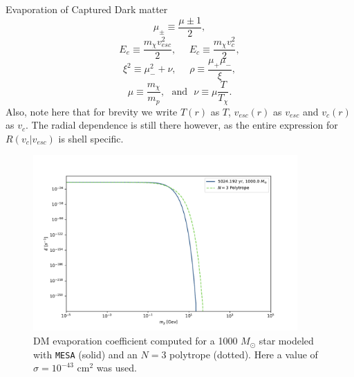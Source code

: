 \documentclass[a4paper,11pt]{article}
\begin{document}
\begin{section}{Evaporation of Captured Dark matter}
\begin{equation*}
    \end{equation*}
    \begin{equation*}
        \mu_{\pm} \equiv \frac{\mu \pm 1}{2} , 
    \end{equation*}
    \begin{equation*}
        E_e \equiv \frac{m_\chi v_{esc}^2}{2}, ~~~~~~ E_c \equiv \frac{m_\chi v_c^2}{2} ,
    \end{equation*}
    \begin{equation*}
        \xi^2 \equiv \mu_-^2 + \nu, ~~~~~~ \rho \equiv \frac{\mu_+\mu_-}{\xi} ,
    \end{equation*}
    \begin{equation*}
        \mu \equiv \frac{m_\chi}{m_p}, ~~~\text{and}~~~ \nu \equiv \mu \frac{T}{T_\chi} .
    \end{equation*}
    Also, note here that for brevity we write $T(r)$ as $T$, $v_{esc}(r)$ as $v_{esc}$ and $v_{c}(r)$ as $v_c$. The radial dependence is still there however, as the entire expression for $R(v_c | v_{esc})$ is shell specific.

    \begin{figure}
        \centering
        \includegraphics[width=0.9\textwidth]{Evap.pdf}
        \caption{DM evaporation coefficient computed for a 1000 $M_\odot$ star modeled with \texttt{MESA} (solid) and an $N=3$ polytrope (dotted). Here a value of $\sigma = 10^{-43}$ cm$^2$ was used.}
        \label{evap}
    \end{figure}


\end{section}
\end{document}
